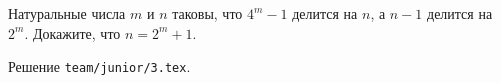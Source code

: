 \problem{}
Натуральные числа $m$ и $n$ таковы, что $4^m-1$ делится на $n$, а $n-1$ делится
на $2^m$.
Докажите, что $n = 2^m+1$.

\solution Решение \texttt{team/junior/3.tex}.
\endproblem
